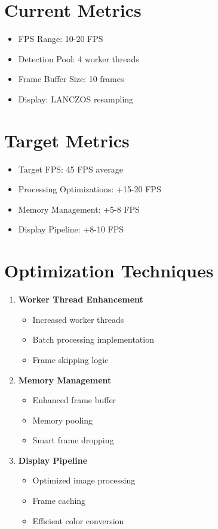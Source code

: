 \documentclass[11pt,a4paper]{report}
\begin{document}
\section{Current Metrics}
\begin{itemize}
    \item FPS Range: 10-20 FPS
    \item Detection Pool: 4 worker threads
    \item Frame Buffer Size: 10 frames
    \item Display: LANCZOS resampling
\end{itemize}

\section{Target Metrics}
\begin{itemize}
    \item Target FPS: 45 FPS average
    \item Processing Optimizations: +15-20 FPS
    \item Memory Management: +5-8 FPS
    \item Display Pipeline: +8-10 FPS
\end{itemize}

\section{Optimization Techniques}
\begin{enumerate}
    \item \textbf{Worker Thread Enhancement}
    \begin{itemize}
        \item Increased worker threads
        \item Batch processing implementation
        \item Frame skipping logic
    \end{itemize}
    
    \item \textbf{Memory Management}
    \begin{itemize}
        \item Enhanced frame buffer
        \item Memory pooling
        \item Smart frame dropping
    \end{itemize}
    
    \item \textbf{Display Pipeline}
    \begin{itemize}
        \item Optimized image processing
        \item Frame caching
        \item Efficient color conversion
    \end{itemize}
\end{enumerate}
\end{document}
